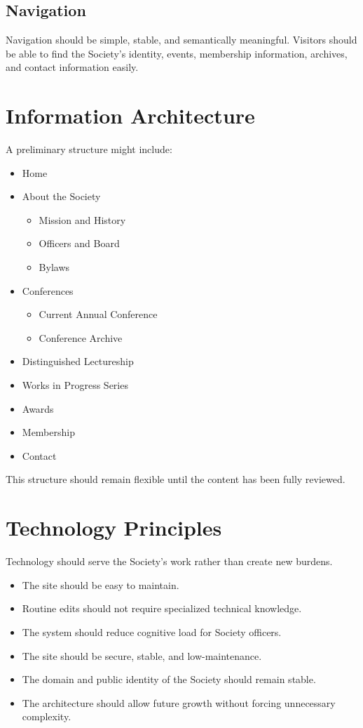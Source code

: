 \documentclass[11pt]{article}
\begin{document}
\subsection{Navigation}

Navigation should be simple, stable, and semantically meaningful. Visitors should be able to find the Society's identity, events, membership information, archives, and contact information easily.

\section{Information Architecture}

A preliminary structure might include:

\begin{itemize}[leftmargin=2em]
    \item Home
    \item About the Society
    \begin{itemize}
        \item Mission and History
        \item Officers and Board
        \item Bylaws
    \end{itemize}
    \item Conferences
    \begin{itemize}
        \item Current Annual Conference
        \item Conference Archive
    \end{itemize}
    \item Distinguished Lectureship
    \item Works in Progress Series
    \item Awards
    \item Membership
    \item Contact
\end{itemize}

This structure should remain flexible until the content has been fully reviewed.

\section{Technology Principles}

Technology should serve the Society's work rather than create new burdens.

\begin{itemize}[leftmargin=2em]
    \item The site should be easy to maintain.
    \item Routine edits should not require specialized technical knowledge.
    \item The system should reduce cognitive load for Society officers.
    \item The site should be secure, stable, and low-maintenance.
    \item The domain and public identity of the Society should remain stable.
    \item The architecture should allow future growth without forcing unnecessary complexity.
\end{itemize}
\end{document}
